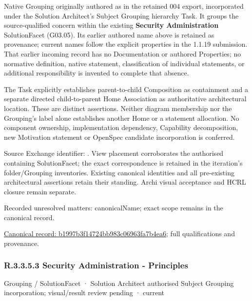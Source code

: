 Native Grouping originally authored as \texttt{} in the retained 004 export,
incorporated under the Solution Architect's Subject Grouping hierarchy Task.
It groups the source-qualified \texttt{} concern within
the existing \textbf{Security Administration} SolutionFacet (G03.05). Its earlier authored name above is retained as provenance; current names
follow the explicit properties in the 1.1.19 submission.
That earlier incoming record has no Documentation or authored Properties; no normative
definition, native statement, classification of individual statements, or
additional responsibility is invented to complete that absence.



The Task explicitly establishes parent-to-child Composition as containment and
a separate directed child-to-parent Home Association as authoritative architectural
location. These are distinct assertions. Neither diagram membership nor the
Grouping's label alone establishes another Home or a statement allocation.
No component ownership, implementation dependency, Capability decomposition,
new Motivation statement or OpenSpec candidate incorporation is conferred.



Source Exchange identifier: \texttt{}. View placement corroborates
the authorised containing SolutionFacet; the exact correspondence is retained in the
iteration's folder/Grouping inventories. Existing canonical identities and all
pre-existing architectural assertions retain their standing. Archi visual
acceptance and HCRL closure remain separate.


{\small Recorded unresolved matters: canonicalName; exact scope remains in the canonical record.}\par
{\footnotesize \href{../../../../../../../continuum/grouping/b1997b3f14724bb983c06963fa7b4ea6.md}{Canonical record: b1997b3f14724bb983c06963fa7b4ea6}; full qualifications and provenance.}\par
\subsubsection*{R.3.3.5.3 Security Administration - Principles}
\label{navigation:R.3.3.5.3}

\label{element:c189826cd7024780abd89fa4f067947a}
{\small Grouping / SolutionFacet · Solution Architect authorised Subject Grouping incorporation; visual/result review pending · current}\par

